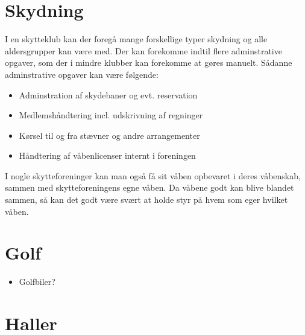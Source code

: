 \section{Skydning}
I en skytteklub kan der foregå mange forskellige typer skydning og alle aldersgrupper kan være med. Der kan forekomme indtil flere adminstrative opgaver, som der i mindre klubber kan forekomme at gøres manuelt. Sådanne adminstrative opgaver kan være følgende:
\begin{itemize}
\item Adminstration af skydebaner og evt. reservation
\item Medlemshåndtering incl. udskrivning af regninger
\item Kørsel til og fra stævner og andre arrangementer
\item Håndtering af våbenlicenser internt i foreningen
\end{itemize}
I nogle skytteforeninger kan man også få sit våben opbevaret i deres våbenskab, sammen med skytteforeningens egne våben. Da våbene godt kan blive blandet sammen, så kan det godt være svært at holde styr på hvem som eger hvilket våben.

\section{Golf}
\begin{itemize}
\item Golfbiler?

\end{itemize}

\section{Haller}
